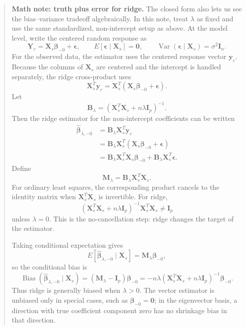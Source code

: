 \begin{quote}
\textbf{Math note: truth plus error for ridge.}
The closed form also lets us see the bias--variance tradeoff algebraically.  In this note, treat \(\lambda\) as fixed and use the same standardized, non-intercept setup as above.  At the model level, write the centered random response as
\[
  \mathbf{Y}_c=\mathbf{X}_s\boldsymbol{\beta}_{-0}+\boldsymbol{\epsilon},
  \qquad
  E[\boldsymbol{\epsilon}\mid\mathbf{X}_s]=\mathbf{0},
  \qquad
  \operatorname{Var}(\boldsymbol{\epsilon}\mid\mathbf{X}_s)=\sigma^2\mathbf{I}_n.
\]
For the observed data, the estimator uses the centered response vector \(\mathbf{y}_c\).  Because the columns of \(\mathbf{X}_s\) are centered and the intercept is handled separately, the ridge cross-product uses
\[
  \mathbf{X}_s^T\mathbf{y}_c
  =
  \mathbf{X}_s^T(\mathbf{X}_s\boldsymbol{\beta}_{-0}+\boldsymbol{\epsilon}).
\]
Let
\[
  \mathbf{B}_{\lambda}
  =
  (\mathbf{X}_s^T\mathbf{X}_s+n\lambda\mathbf{I}_p)^{-1}.
\]
Then the ridge estimator for the non-intercept coefficients can be written
\begin{align*}
  \widehat{\boldsymbol{\beta}}_{\lambda,-0}
  &=\mathbf{B}_{\lambda}\mathbf{X}_s^T\mathbf{y}_c \\
  &=\mathbf{B}_{\lambda}\mathbf{X}_s^T
    (\mathbf{X}_s\boldsymbol{\beta}_{-0}+\boldsymbol{\epsilon}) \\
  &=\mathbf{B}_{\lambda}\mathbf{X}_s^T\mathbf{X}_s\boldsymbol{\beta}_{-0}
    +\mathbf{B}_{\lambda}\mathbf{X}_s^T\boldsymbol{\epsilon}.
\end{align*}
Define
\[
  \mathbf{M}_{\lambda}
  =\mathbf{B}_{\lambda}\mathbf{X}_s^T\mathbf{X}_s.
\]
For ordinary least squares, the corresponding product cancels to the identity matrix when \(\mathbf{X}_s^T\mathbf{X}_s\) is invertible.  For ridge,
\[
  (\mathbf{X}_s^T\mathbf{X}_s+n\lambda\mathbf{I}_p)^{-1}\mathbf{X}_s^T\mathbf{X}_s
  \neq \mathbf{I}_p
\]
unless \(\lambda=0\).  This is the no-cancellation step: ridge changes the target of the estimator.

Taking conditional expectation gives
\[
  E[\widehat{\boldsymbol{\beta}}_{\lambda,-0}\mid\mathbf{X}_s]
  =\mathbf{M}_{\lambda}\boldsymbol{\beta}_{-0},
\]
so the conditional bias is
\[
  \operatorname{Bias}(\widehat{\boldsymbol{\beta}}_{\lambda,-0}\mid\mathbf{X}_s)
  =(\mathbf{M}_{\lambda}-\mathbf{I}_p)\boldsymbol{\beta}_{-0}
  =-n\lambda(\mathbf{X}_s^T\mathbf{X}_s+n\lambda\mathbf{I}_p)^{-1}\boldsymbol{\beta}_{-0}.
\]
Thus ridge is generally biased when \(\lambda>0\).  The vector estimator is unbiased only in special cases, such as \(\boldsymbol{\beta}_{-0}=\mathbf{0}\); in the eigenvector basis, a direction with true coefficient component zero has no shrinkage bias in that direction.


\end{quote}
